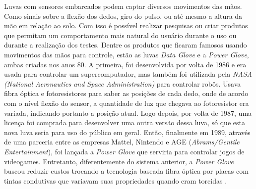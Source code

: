 \documentclass[
	12pt,				%
	openright,			%
	oneside,			%
	a4paper,			%
	english,			%
	brazil				%
	]{abntex2}
\begin{document}
		
		Luvas com sensores embarcados podem captar diversos movimentos das mãos. Como sinais sobre a flexão dos dedos, giro do pulso, ou até mesmo a altura da mão em relação ao solo. Com isso é possível realizar pesquisas ou criar produtos que permitam um comportamento mais natural do usuário durante o uso ou durante a realização dos testes. Dentre os produtos que ficaram famosos usando movimentos das mãos para controle, estão as luvas \textit{Data Glove} e a \textit{Power Glove}, ambas criadas nos anos 80. A primeira, foi desenvolvida por volta de 1986 e era usada para controlar um supercomputador, mas também foi utilizada pela \textit{NASA (National Aeronautics and Space Administration)} para controlar robôs. Usava fibra óptica e fotoresistores para saber as posições de cada dedo, onde de acordo com o nível flexão do sensor, a quantidade de luz que chegava ao fotoresistor era variada, indicando portanto a posição atual. Logo depois, por volta de 1987, uma licença foi comprada para desenvolver uma outra versão dessa luva, só que esta nova luva seria para uso do público em geral. Então, finalmente em 1989, através de uma parceria entre as empresas Mattel, Nintendo e AGE (\textit{Abrams/Gentile Entertainment}), foi lançada a \textit{Power Glove} que serviria para controlar jogos de videogames. Entretanto, diferentemente do sistema anterior, a \textit{Power Glove} buscou reduzir custos trocando a tecnologia baseada fibra óptica por placas com tintas condutivas que variavam suas propriedades quando eram torcidas \cite{dana1989powerglove}. 
	
\end{document}
